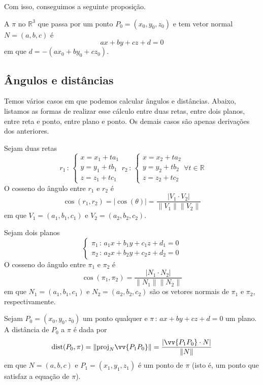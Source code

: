 \documentclass[../main.tex]{subfiles}
\begin{document}
			Com isso, conseguimos a seguinte proposição.
			
			\begin{proposicao}
				A  $\pi$ no $\mathbb{R}^3$ que passa por um ponto $P_0=(x_0, y_0, z_0)$ e tem vetor normal $N=(a,b,c)$ é
				\[
				ax+by+cz+d=0
				\]
				em que $d=-(ax_0+by_0+cz_0)$.
			\end{proposicao}
		\subsection*{Ângulos e distâncias}
			Temos vários casos em que podemos calcular ângulos e distâncias. Abaixo, listamos as formas de realizar esse cálculo entre duas retas, entre dois planos, entre reta e ponto, entre plano e ponto. Os demais casos são apenas derivações dos anteriores.
			\begin{proposicao}
				Sejam duas retas
				\[
				r_1\, \colon \, \begin{cases}
					x=x_1+ta_1\\
					y=y_1+tb_1\\
					z=z_1+tc_1
				\end{cases}
				r_2\,\colon\, \begin{cases}
					x=x_2+ta_2\\
					y=y_2+tb_2\\
					z=z_2+tc_2
				\end{cases}\forall t\in\mathbb{R}
				\]	
				O cosseno do ângulo entre $r_1$ e $r_2$ é
				\[
				\cos(r_1,r_2)=|\cos(\theta)|=\frac{|V_1\cdot V_2|}{\|V_1\|\|V_2\|}
				\]
				em que $V_1=(a_1,b_1,c_1)$ e $V_2=(a_2,b_2,c_2)$.
			\end{proposicao}
			\begin{proposicao}
				Sejam dois planos
				\[\begin{cases}
					\pi_1\,\colon\, a_1x+b_1y+c_1z+d_1=0\\
					\pi_2\,\colon\, a_2x+b_2y+c_2z+d_2=0
				\end{cases}
				\]
				O cosseno do ângulo entre $\pi_1$ e $\pi_2$ é
				\[
				\cos(\pi_1,\pi_2)=\frac{|N_1\cdot N_2|}{\|N_1\|\|N_2\|}
				\]
				em que $N_1=(a_1,b_1,c_1)$ e $N_2=(a_2,b_2,c_2)$ são os vetores normais de $\pi_1$ e $\pi_2$, respectivamente.
			\end{proposicao}
			\begin{proposicao}
				Sejam $P_0=(x_0,y_0,z_0)$ um ponto qualquer e $\pi\,\colon\, ax+by+cz+d=0$ um plano. A distância de $P_0$ a $\pi$ é dada por
				\[
				\text{dist}(P_0,\pi)=\|\text{proj}_N \vv{P_1P_0}\|=\frac{|\vv{P_1P_0}\cdot N|}{\|N\|}
				\]
				em que $N=(a,b,c)$ e $P_1=(x_1,y_1,z_1)$ é um ponto de $\pi$ (isto é, um ponto que satisfaz a equação de $\pi$).
			\end{proposicao}
\end{document}
